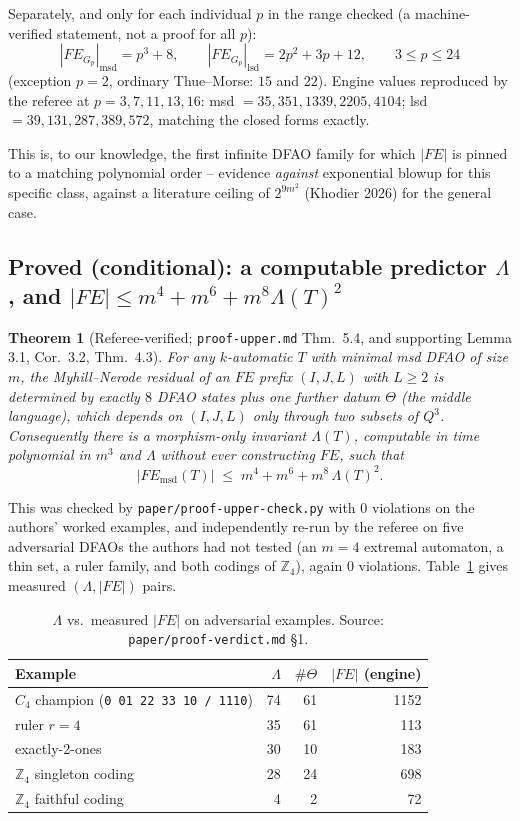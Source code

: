\documentclass[11pt]{article}
\newtheorem{theorem}{Theorem}[section]
\begin{document}
Separately, and only for each individual $p$ in the range checked (a machine-verified
statement, not a proof for all $p$):
$$|FE_{G_p}|_{\mathrm{msd}} = p^3+8,\qquad |FE_{G_p}|_{\mathrm{lsd}} = 2p^2+3p+12,\qquad
3\le p\le24$$
(exception $p=2$, ordinary Thue--Morse: $15$ and $22$). Engine values reproduced by the
referee at $p=3,7,11,13,16$: msd $=35,351,1339,2205,4104$; lsd $=39,131,287,389,572$,
matching the closed forms exactly.

This is, to our knowledge, the first infinite DFAO family for which $|FE|$ is pinned to a
matching polynomial order -- evidence \emph{against} exponential blowup for this specific
class, against a literature ceiling of $2^{9m^2}$ (Khodier 2026) for the general case.

\subsection{Proved (conditional): a computable predictor $\Lambda$, and $|FE|\le m^4+m^6+m^8\Lambda(T)^2$}

\begin{theorem}[Referee-verified; \texttt{proof-upper.md} Thm.\ 5.4, and supporting Lemma 3.1, Cor.\ 3.2, Thm.\ 4.3]
\label{thm:lambda}
For any $k$-automatic $T$ with minimal msd DFAO of size $m$, the Myhill--Nerode residual
of an $FE$ prefix $(I,J,L)$ with $L\ge2$ is determined by exactly $8$ DFAO states plus
one further datum $\Theta$ (the \emph{middle language}), which depends on $(I,J,L)$ only
through two subsets of $Q^3$. Consequently there is a morphism-only invariant
$\Lambda(T)$, computable in time polynomial in $m^3$ and $\Lambda$ without ever
constructing $FE$, such that
$$|FE_{\mathrm{msd}}(T)| \;\le\; m^4+m^6+m^8\,\Lambda(T)^2.$$
\end{theorem}
This was checked by \texttt{paper/proof-upper-check.py} with $0$ violations on the
authors' worked examples, and independently re-run by the referee on five adversarial
DFAOs the authors had not tested (an $m=4$ extremal automaton, a thin set, a ruler
family, and both codings of $\mathbb Z_4$), again $0$ violations. Table~\ref{tab:lambda}
gives measured $(\Lambda, |FE|)$ pairs.

\begin{table}[h]
\centering
\caption{$\Lambda$ vs.\ measured $|FE|$ on adversarial examples. Source:
\texttt{paper/proof-verdict.md} \S1.}
\label{tab:lambda}
\begin{tabular}{@{}lrrr@{}}
\toprule
Example & $\Lambda$ & $\#\Theta$ & $|FE|$ (engine) \\
\midrule
$C_4$ champion (\texttt{0 01 22 33 10 / 1110}) & 74 & 61 & 1152 \\
ruler $r=4$ & 35 & 61 & 113 \\
exactly-2-ones & 30 & 10 & 183 \\
$\mathbb Z_4$ singleton coding & 28 & 24 & 698 \\
$\mathbb Z_4$ faithful coding & 4 & 2 & 72 \\
\bottomrule
\end{tabular}
\end{table}
\end{document}

